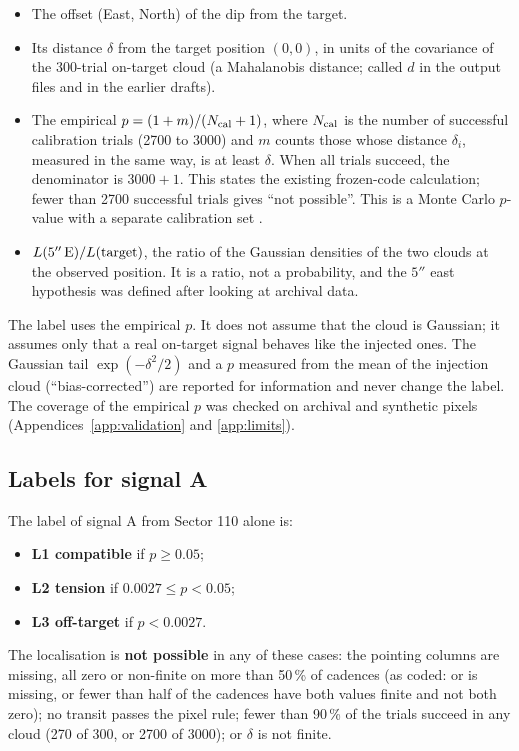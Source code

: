 \begin{itemize}
\item The offset (East, North) of the dip from the target.
\item Its distance $\delta$ from the target position $(0, 0)$, in units of the covariance of the 300-trial on-target
  cloud (a Mahalanobis distance; called $d$ in the output files and in the earlier drafts).
\item The empirical $p = (1 + m)/(N_{\rm cal} + 1)$, where $N_{\rm cal}$ is the number of successful calibration
  trials (2700 to 3000) and $m$ counts those whose distance $\delta_i$, measured in the same way, is at least
  $\delta$. When all trials succeed, the denominator is $3000+1$. This states the existing frozen-code
  calculation; fewer than 2700 successful trials gives ``not possible''. This is a Monte Carlo $p$-value with a separate
  calibration set \citep{DavisonHinkley1997,North2002,Bates2023}.
\item $L(5''\,{\rm E})/L({\rm target})$, the ratio of the Gaussian densities of the two clouds at the observed position.
  It is a ratio, not a probability, and the $5''$ east hypothesis was defined after looking at archival data.
\end{itemize}
The label uses the empirical $p$. It does not assume that the cloud is Gaussian; it assumes only that a real on-target
signal behaves like the injected ones. The Gaussian tail $\exp(-\delta^2/2)$ and a $p$ measured from the mean of the
injection cloud (``bias-corrected'') are reported for information and never change the label. The coverage of the
empirical $p$ was checked on archival and synthetic pixels (Appendices~\ref{app:validation} and \ref{app:limits}).

\subsection{Labels for signal A}

The label of signal A from Sector 110 alone is:
\begin{itemize}
\item \textbf{L1 compatible} if $p \geq 0.05$;
\item \textbf{L2 tension} if $0.0027 \leq p < 0.05$;
\item \textbf{L3 off-target} if $p < 0.0027$.
\end{itemize}

The localisation is \textbf{not possible} in any of these cases: the pointing columns are missing, all zero or
non-finite on more than 50\,\% of cadences (as coded:  or  is missing, or fewer than
half of the cadences have both values finite and not both zero); no transit passes the pixel rule; fewer than 90\,\% of the
trials succeed in any cloud (270 of 300, or 2700 of 3000); or $\delta$ is not finite.

